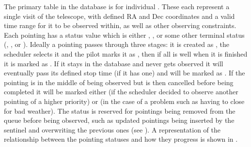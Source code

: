 \begin{colsection}
The primary table in the database is for individual . These each represent a single visit of the telescope, with defined RA and Dec coordinates and a valid time range for it to be observed within, as well as other observing constraints. Each pointing has a status value which is either , ,  or some other terminal status (, ,  or ). Ideally a pointing passes through three stages: it is created as , the scheduler selects it and the pilot marks it as , then if all is well when it is finished it is marked as . If it stays in the database and never gets observed it will eventually pass its defined stop time (if it has one) and will be marked as . If the pointing is in the middle of being observed but is then cancelled before being completed it will be marked either  (if the scheduler decided to observe another pointing of a higher priority) or  (in the case of a problem such as having to close for bad weather). The  status is reserved for pointings being removed from the queue before being observed, such as updated pointings being inserted by the sentinel and overwriting the previous ones (see ). A representation of the relationship between the pointing statuses and how they progress is shown in .


\end{colsection}
